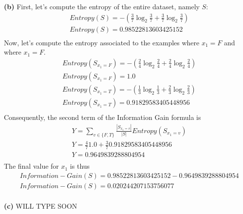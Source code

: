 \documentclass[leqno]{article}
\begin{document}
\noindent \textbf{(b)} First, let's compute the entropy of the entire dataset, namely $S$:
\begin{equation*}
\begin{split}
&Entropy(S) = -(\frac{3}{7}\log_2\frac{3}{7} + \frac{3}{7}\log_2\frac{3}{7}) \\
&Entropy(S) = 0.98522813603425152 \\
\end{split}
\end{equation*}
Now, let's compute the entropy associated to the examples where $x_1 = F$ and where $x_1 = F$.
\begin{equation*}
\begin{split}
&Entropy(S_{x_1 = F}) = -(\frac{2}{4}\log_2\frac{2}{4} + \frac{2}{4}\log_2\frac{2}{4}) \\
&Entropy(S_{x_1 = F}) = 1.0 \\
&Entropy(S_{x_1 = T}) = -(\frac{1}{3}\log_2\frac{1}{3} + \frac{2}{3}\log_2\frac{2}{3}) \\
&Entropy(S_{x_1 = T}) = 0.91829583405448956 \\
\end{split}
\end{equation*} 
Consequently, the second term of the Information Gain formula is
\begin{equation*}
\begin{split}
&Y = \sum_{v \in \{F, T\}}\frac{|S_{x_1 = v}|}{|S|}Entropy(S_{x_1 = v}) \\ 
&Y = \frac{4}{7}1.0 + \frac{3}{7}0.91829583405448956 \\
&Y = 0.9649839288804954 \\
\end{split}
\end{equation*} 
The final value for $x_1$ is thus
\begin{equation*}
\begin{split}
&Information-Gain(S) = 0.98522813603425152 - 0.9649839288804954 \\
&Information-Gain(S) = 0.020244207153756077 \\
\end{split}
\end{equation*} 

\hfill

\noindent \textbf{(c)} WILL TYPE SOON

\hfill
\end{document}
